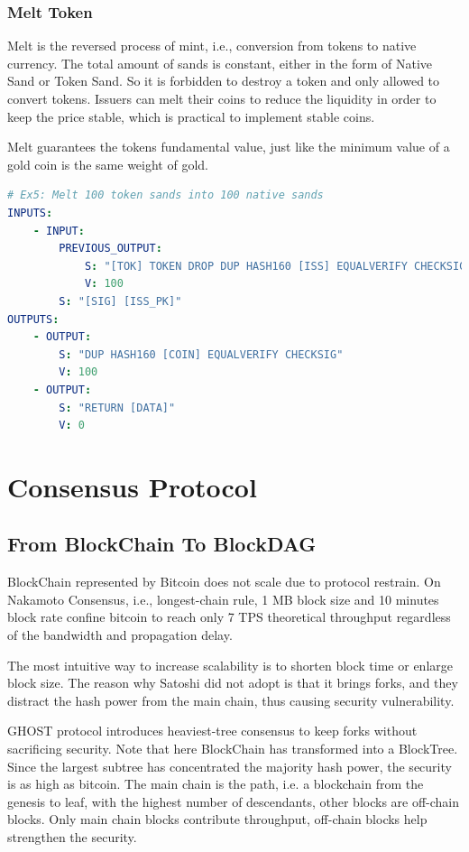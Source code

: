\documentclass[a4paper,11pt]{article}
\begin{document}
\subsubsection{Melt Token}

Melt is the reversed process of mint, i.e., conversion from tokens to native currency. The total amount of sands is constant, either in the form of Native Sand or Token Sand. So it is forbidden to destroy a token and only allowed to convert tokens. Issuers can melt their coins to reduce the liquidity in order to keep the price stable, which is practical to implement stable coins.


Melt guarantees the tokens fundamental value, just like the minimum value of a gold coin is the same weight of gold. 

\lstset{basicstyle=\tiny,style=myListStyle}
\begin{lstlisting}[language=yaml, numbers=none,basicstyle=\footnotesize]
# Ex5: Melt 100 token sands into 100 native sands
INPUTS:
	- INPUT:
		PREVIOUS_OUTPUT:
			S: "[TOK] TOKEN DROP DUP HASH160 [ISS] EQUALVERIFY CHECKSIG"
			V: 100
		S: "[SIG] [ISS_PK]"
OUTPUTS:
	- OUTPUT:
		S: "DUP HASH160 [COIN] EQUALVERIFY CHECKSIG"
		V: 100
	- OUTPUT:
		S: "RETURN [DATA]"
		V: 0
\end{lstlisting}


\section{Consensus Protocol}


\subsection{From BlockChain To BlockDAG}
BlockChain represented by Bitcoin does not scale due to protocol restrain. On Nakamoto Consensus, i.e., longest-chain rule, 1 MB block size and 10 minutes block rate confine bitcoin to reach only 7 TPS  theoretical throughput regardless of the bandwidth and propagation delay. 

The most intuitive way to increase scalability is to shorten block time or enlarge block size. The reason why Satoshi did not adopt is that it brings forks, and they distract the hash power from the main chain, thus causing security vulnerability.  

GHOST protocol introduces heaviest-tree consensus to keep forks without sacrificing security. Note that here BlockChain has transformed into a BlockTree. Since the largest subtree has concentrated the majority hash power, the security is as high as bitcoin. The main chain is the path,  i.e. a blockchain from the genesis to leaf, with the highest number of descendants, other blocks are off-chain blocks. Only main chain blocks contribute throughput, off-chain blocks help strengthen the security.
\end{document}
